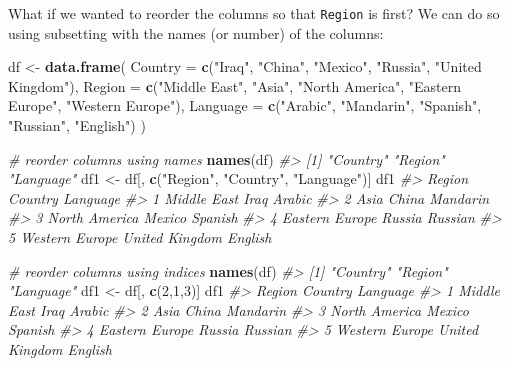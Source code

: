 \documentclass[]{book}
\newenvironment{Shaded}{\begin{snugshade}}{\end{snugshade}}
\newcommand{\CommentTok}[1]{\textcolor[rgb]{0.56,0.35,0.01}{\textit{#1}}}
\newcommand{\DataTypeTok}[1]{\textcolor[rgb]{0.13,0.29,0.53}{#1}}
\newcommand{\DecValTok}[1]{\textcolor[rgb]{0.00,0.00,0.81}{#1}}
\newcommand{\KeywordTok}[1]{\textcolor[rgb]{0.13,0.29,0.53}{\textbf{#1}}}
\newcommand{\NormalTok}[1]{#1}
\newcommand{\StringTok}[1]{\textcolor[rgb]{0.31,0.60,0.02}{#1}}
\begin{document}
What if we wanted to reorder the columns so that \texttt{Region} is first? We can do so using subsetting with the names (or number) of the columns:

\begin{Shaded}
\begin{Highlighting}[]
\NormalTok{df <-}\StringTok{ }\KeywordTok{data.frame}\NormalTok{(}
  \DataTypeTok{Country =} \KeywordTok{c}\NormalTok{(}\StringTok{"Iraq"}\NormalTok{, }\StringTok{"China"}\NormalTok{, }\StringTok{"Mexico"}\NormalTok{, }\StringTok{"Russia"}\NormalTok{, }\StringTok{"United Kingdom"}\NormalTok{),}
  \DataTypeTok{Region =} \KeywordTok{c}\NormalTok{(}\StringTok{"Middle East"}\NormalTok{, }\StringTok{"Asia"}\NormalTok{, }\StringTok{"North America"}\NormalTok{, }\StringTok{"Eastern Europe"}\NormalTok{, }\StringTok{"Western Europe"}\NormalTok{),}
  \DataTypeTok{Language =} \KeywordTok{c}\NormalTok{(}\StringTok{"Arabic"}\NormalTok{, }\StringTok{"Mandarin"}\NormalTok{, }\StringTok{"Spanish"}\NormalTok{, }\StringTok{"Russian"}\NormalTok{, }\StringTok{"English"}\NormalTok{)}
\NormalTok{)}

\CommentTok{# reorder columns using names}
\KeywordTok{names}\NormalTok{(df)}
\CommentTok{#> [1] "Country"  "Region"   "Language"}
\NormalTok{df1 <-}\StringTok{ }\NormalTok{df[, }\KeywordTok{c}\NormalTok{(}\StringTok{"Region"}\NormalTok{, }\StringTok{"Country"}\NormalTok{, }\StringTok{"Language"}\NormalTok{)]}
\NormalTok{df1}
\CommentTok{#>           Region        Country Language}
\CommentTok{#> 1    Middle East           Iraq   Arabic}
\CommentTok{#> 2           Asia          China Mandarin}
\CommentTok{#> 3  North America         Mexico  Spanish}
\CommentTok{#> 4 Eastern Europe         Russia  Russian}
\CommentTok{#> 5 Western Europe United Kingdom  English}

\CommentTok{# reorder columns using indices}
\KeywordTok{names}\NormalTok{(df)}
\CommentTok{#> [1] "Country"  "Region"   "Language"}
\NormalTok{df1 <-}\StringTok{ }\NormalTok{df[, }\KeywordTok{c}\NormalTok{(}\DecValTok{2}\NormalTok{,}\DecValTok{1}\NormalTok{,}\DecValTok{3}\NormalTok{)]}
\NormalTok{df1}
\CommentTok{#>           Region        Country Language}
\CommentTok{#> 1    Middle East           Iraq   Arabic}
\CommentTok{#> 2           Asia          China Mandarin}
\CommentTok{#> 3  North America         Mexico  Spanish}
\CommentTok{#> 4 Eastern Europe         Russia  Russian}
\CommentTok{#> 5 Western Europe United Kingdom  English}
\end{Highlighting}
\end{Shaded}
\end{document}
